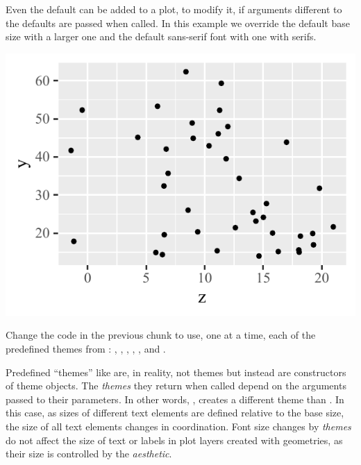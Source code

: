 \documentclass[krantz2]{krantz}\usepackage{knitr}
\begin{document}
Even the default  can be added to a plot, to modify it, if arguments different to the defaults are passed when called. In this example we override the default base size with a larger one and the default sans-serif font with one with serifs.

\begin{knitrout}\footnotesize
{}\color{fgcolor}\begin{kframe}
\begin{alltt}
  \hlopt{+}
  \hlstd{()} \hlopt{+}
  \hlstd{(} \hlstd{=} \hlstd{,}
              \hlstd{=} \hlstd{)}
\end{alltt}
\end{kframe}

{\centering \includegraphics[width=.54\textwidth]{figure/pos-themes-01-1} 

}


\end{knitrout}

\begin{playground}
Change the code in the previous chunk to use, one at a time, each of the predefined themes from \ggplot: , , , , ,  and .
\end{playground}

\begin{explainbox}
Predefined ``themes'' like  are, in reality, not themes but instead are constructors of theme objects. The \emph{themes} they return when called depend on the arguments passed to their parameters. In other words, , creates a different theme than . In this case, as sizes of different text elements are defined relative to the base size, the size of all text elements changes in coordination. Font size changes by \emph{themes} do not affect the size of text or labels in plot layers created with geometries, as their size is controlled by the  \emph{aesthetic}.
\end{explainbox}
\end{document}
